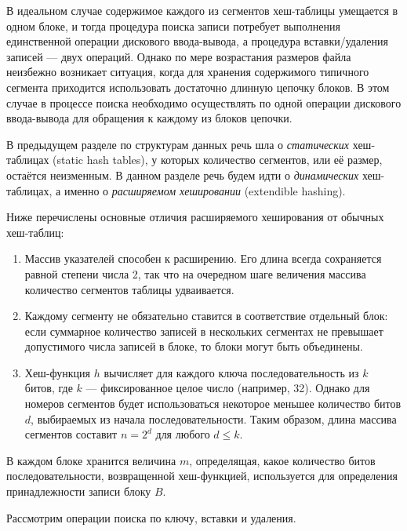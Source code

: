 В идеальном случае содержимое каждого из сегментов хеш-таблицы умещается в одном блоке, и тогда процедура поиска записи потребует выполнения единственной операции дискового ввода-вывода, а процедура вставки/удаления записей — двух операций. Однако по мере возрастания размеров файла неизбежно возникает ситуация, когда для хранения содержимого типичного сегмента приходится использовать достаточно длинную цепочку блоков. В этом случае в процессе поиска необходимо осуществлять по одной операции дискового ввода-вывода для обращения к каждому из блоков цепочки.

В предыдущем разделе по структурам данных речь шла о \emph{статических} хеш-таблицах (static hash tables), у которых количество сегментов, или её размер, остаётся неизменным. В данном разделе речь будем идти о \emph{динамических} хеш-таблицах, а именно о \emph{расширяемом хешировании} (extendible hashing).

Ниже перечислены основные отличия расширяемого хеширования от обычных хеш-таблиц:
\begin{enumerate}
  \item Массив указателей способен к расширению. Его длина всегда сохраняется равной степени числа 2, так что на очередном шаге величения массива количество сегментов таблицы удваивается.
  \item Каждому сегменту не обязательно ставится в соответствие отдельный блок: если суммарное количество записей в нескольких сегментах не превышает допустимого числа записей в блоке, то блоки могут быть объединены.
  \item Хеш-функция $h$ вычисляет для каждого ключа последовательность из $k$ битов, где $k$ — фиксированное целое число (например, 32). Однако для номеров сегментов будет использоваться некоторое меньшее количество битов $d$, выбираемых из начала последовательности. Таким образом, длина массива сегментов составит $n = 2^d$ для любого $d \leq k$.
\end{enumerate}

В каждом блоке хранится величина $m$, определящая, какое количество битов последовательности, возвращенной хеш-функцией, используется для определения принадлежности записи блоку $B$.

Рассмотрим операции поиска по ключу, вставки и удаления.


